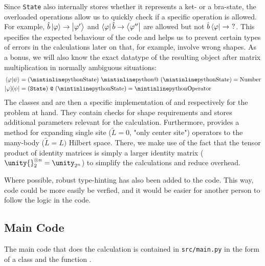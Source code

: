         Since \texttt{State} also internally stores whether it represents a ket- or a bra-state, the overloaded operations allow us to quickly check if a specific operation is allowed. For example, $\hat{b} \ket{\varphi} \rightarrow \ket{\varphi'}$ and $\bra{\varphi}\hat{b} \rightarrow \bra{\varphi''}$ are allowed but not $\hat{b} \bra{\varphi} \rightarrow~?$. This specifies the expected behaviour of the code and helps us to prevent certain types of errors in the calculations later on that, for example, involve wrong shapes. As a bonus, we will also know the exact datatype of the resulting object after matrix multiplication in normally ambiguous situations:
        \begin{align}
            \braket{\varphi}{\psi} &= (\text{\inpycode{State}})\text{ \inpycode{@} }(\text{\inpycode{State}}) = \text{Number} \\
            \dyad{\varphi}{\psi} &= (\text{\texttt{State}})\text{ \texttt{@} }(\text{\inpycode{State}}) = \text{\inpycode{Operator}}
        \end{align}
        The classes  and  are then a specific implementation of  and  respectively for the problem at hand. They contain checks for shape requirements and stores additional parameters relevant for the calculation. Furthermore,   provides a method for expanding single site ($\tilde{L} = 0$, "only center site") operators to the many-body ($\tilde{L} = L)$ Hilbert space. There, we make use of the fact that the tensor product of identity matrices is simply a larger identity matrix ($\unity{}^{\otimes n}_2 = \unity_{2^n}$) to simplify the calculations and reduce overhead. 

        Where possible, robust type-hinting has also been added to the code. This way, code could be more easily be verfied, and it would be easier for another person to follow the logic in the code. 

    \subsection{Main Code}
        The main code that does the calculation is contained in \texttt{src/main.py} in the form of a  class and the function .

